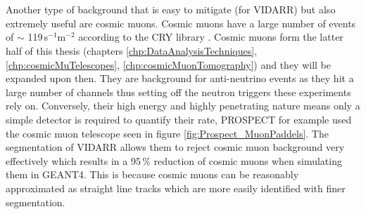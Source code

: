 \\\\Another type of background that is easy to mitigate (for VIDARR) but also extremely useful are cosmic muons. Cosmic muons have a large number of events of $\sim$ 119\,s$^{-1}$m$^{-2}$ according to the CRY library \cite{ieee_cry_2007}. Cosmic muons form the latter half of this thesis (chapters \ref{chp:DataAnalysisTechniques}, \ref{chp:cosmicMuTelescopes}, \ref{chp:cosmicMuonTomography}) and they will be expanded upon then. They are background for anti-neutrino events as they hit a large number of channels thus setting off the neutron triggers these experiments rely on. Conversely, their high energy and highly penetrating nature means only a simple detector is required to quantify their rate, PROSPECT for example used the cosmic muon telescope seen in figure \ref{fig:Prospect_MuonPaddels}. The segmentation of VIDARR allows them to reject cosmic muon background very effectively which results in a 95\,\% reduction of cosmic muons when simulating them in GEANT4. This is because cosmic muons can be reasonably approximated as straight line tracks which are more easily identified with finer segmentation. %


